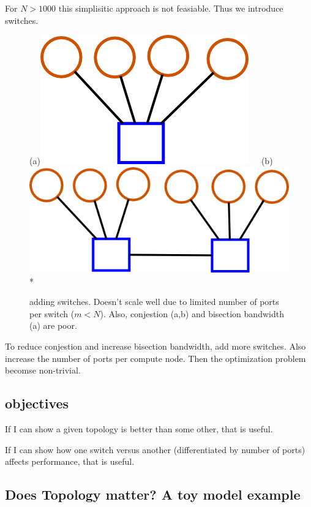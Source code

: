 \documentclass[pdftex]{article}
\begin{document}
For $N>1000$ this simplisitic approach is not feasiable. Thus we introduce switches.
\begin{figure}[h!]
\begin{center}
(a)\includegraphics[scale=0.2]{pictures/N4_n1_M1_m4}\ \ \ 
(b)\includegraphics[scale=0.2]{pictures/N6_n1_M2_m4}\\*
\caption{adding switches. Doesn't scale well due to limited number of ports per switch ($m<N$). Also, conjestion (a,b) and bisection bandwidth (a) are poor.}
\end{center}
\end{figure}

To reduce conjestion and increase bisection bandwidth, add more switches. Also increase the number of ports per compute node. Then the optimization problem becomse non-trivial.

\subsection{objectives}

If I can show a given topology is better than some other, that is useful.

If I can show how one switch versus another (differentiated by number of ports) affects performance, that is useful.

\subsection{Does Topology matter? A toy model example}
\end{document}
